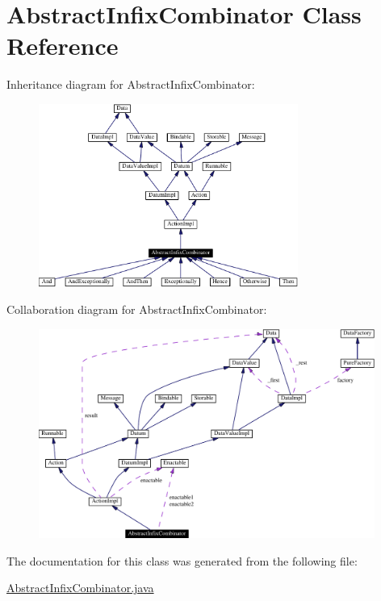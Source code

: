 \hypertarget{classAbstractInfixCombinator}{
\section{Abstract\-Infix\-Combinator  Class Reference}
\label{classAbstractInfixCombinator}
}
Inheritance diagram for Abstract\-Infix\-Combinator:\begin{figure}[H]
\begin{center}
\leavevmode
\includegraphics[width=241pt]{classAbstractInfixCombinator__inherit__graph}
\end{center}
\end{figure}
Collaboration diagram for Abstract\-Infix\-Combinator:\begin{figure}[H]
\begin{center}
\leavevmode
\includegraphics[width=312pt]{classAbstractInfixCombinator__coll__graph}
\end{center}
\end{figure}


The documentation for this class was generated from the following file:\begin{CompactItemize}
\item 
\hyperlink{AbstractInfixCombinator_8java-source}{Abstract\-Infix\-Combinator.java}\end{CompactItemize}
